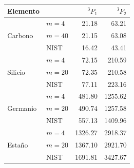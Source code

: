 \begin{tabular}{llrr}
    \toprule
    \textbf{Elemento} &  & $^3P_1$ & $^3P_2$ \\
    \midrule
    \multirow{3}{*}{Carbono} & $m = 4$ & 21.18 & 63.21 \\
     & $m = 40$ & 21.15 & 63.08 \\
     & NIST & 16.42 & 43.41 \\
    \midrule
    \multirow{3}{*}{Silicio} & $m = 4$ & 72.15 & 210.59 \\
     & $m = 20$ & 72.35 & 210.58 \\
     & NIST & 77.11 & 223.16 \\
    \midrule
    \multirow{3}{*}{Germanio} & $m = 4$ & 481.80 & 1255.62 \\
     & $m = 20$ & 490.74 & 1257.58 \\
     & NIST & 557.13 & 1409.96 \\
    \midrule
    \multirow{3}{*}{Estaño} & $m = 4$ & 1326.27 & 2918.37 \\
     & $m = 20$ & 1367.10 & 2921.70 \\
     & NIST & 1691.81 & 3427.67 \\
    \bottomrule
\end{tabular}
